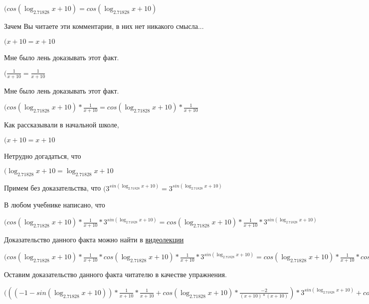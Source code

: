 \documentclass[12pt,a4paper,fleqn]{article}
\theoremstyle{definition}
\begin{document}
$(cos(\log_{ 2.71828 }{ x  +  10 }) = cos(\log_{ 2.71828 }{ x  +  10 })$

Зачем Вы читаете эти комментарии, в них нет никакого смысла...

$( x  +  10  =  x  +  10 $

Мне было лень доказывать этот факт.

$(\frac{ 1 }{ x  +  10 }
 = \frac{ 1 }{ x  +  10 }
$

Мне было лень доказывать этот факт.

$(cos(\log_{ 2.71828 }{ x  +  10 }) * \frac{ 1 }{ x  +  10 }
 = cos(\log_{ 2.71828 }{ x  +  10 }) * \frac{ 1 }{ x  +  10 }
$

Как рассказывали в начальной школе,

$( x  +  10  =  x  +  10 $

Нетрудно догадаться, что

$(\log_{ 2.71828 }{ x  +  10 } = \log_{ 2.71828 }{ x  +  10 }$

Примем без доказательства, что
$({ 3 }^{sin(\log_{ 2.71828 }{ x  +  10 })} = { 3 }^{sin(\log_{ 2.71828 }{ x  +  10 })}$

В любом учебнике написано, что

$(cos(\log_{ 2.71828 }{ x  +  10 }) * \frac{ 1 }{ x  +  10 }
 * { 3 }^{sin(\log_{ 2.71828 }{ x  +  10 })} = cos(\log_{ 2.71828 }{ x  +  10 }) * \frac{ 1 }{ x  +  10 }
 * { 3 }^{sin(\log_{ 2.71828 }{ x  +  10 })}$

Доказательство данного факта можно найти в \href{https://www.youtube.com/watch?v=dQw4w9WgXcQ}{видеолекции}

$(cos(\log_{ 2.71828 }{ x  +  10 }) * \frac{ 1 }{ x  +  10 }
 * cos(\log_{ 2.71828 }{ x  +  10 }) * \frac{ 1 }{ x  +  10 }
 * { 3 }^{sin(\log_{ 2.71828 }{ x  +  10 })} = cos(\log_{ 2.71828 }{ x  +  10 }) * \frac{ 1 }{ x  +  10 }
 * cos(\log_{ 2.71828 }{ x  +  10 }) * \frac{ 1 }{ x  +  10 }
 * { 3 }^{sin(\log_{ 2.71828 }{ x  +  10 })}$

Оставим доказательство данного факта читателю в качестве упражнения.

$((( -1  - sin(\log_{ 2.71828 }{ x  +  10 })) * \frac{ 1 }{ x  +  10 }
 * \frac{ 1 }{ x  +  10 }
 + cos(\log_{ 2.71828 }{ x  +  10 }) * \frac{ -2 }{( x  +  10 ) * ( x  +  10 )}
) * { 3 }^{sin(\log_{ 2.71828 }{ x  +  10 })} + cos(\log_{ 2.71828 }{ x  +  10 }) * \frac{ 1 }{ x  +  10 }
 * cos(\log_{ 2.71828 }{ x  +  10 }) * \frac{ 1 }{ x  +  10 }
 * { 3 }^{sin(\log_{ 2.71828 }{ x  +  10 })} = (( -1  - sin(\log_{ 2.71828 }{ x  +  10 })) * \frac{ 1 }{ x  +  10 }
 * \frac{ 1 }{ x  +  10 }
 + cos(\log_{ 2.71828 }{ x  +  10 }) * \frac{ -2 }{( x  +  10 ) * ( x  +  10 )}
) * { 3 }^{sin(\log_{ 2.71828 }{ x  +  10 })} + cos(\log_{ 2.71828 }{ x  +  10 }) * \frac{ 1 }{ x  +  10 }
 * cos(\log_{ 2.71828 }{ x  +  10 }) * \frac{ 1 }{ x  +  10 }
 * { 3 }^{sin(\log_{ 2.71828 }{ x  +  10 })}$
\end{document}
